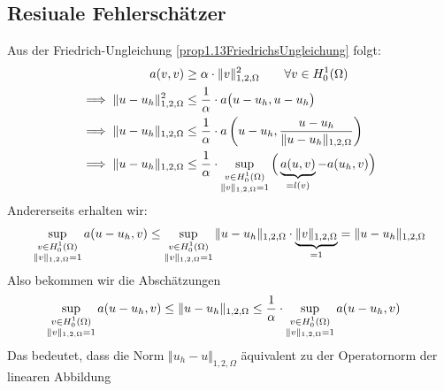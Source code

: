 \subsection*{Resiuale Fehlerschätzer}
Aus der Friedrich-Ungleichung \ref{prop1.13FriedrichsUngleichung} folgt:
\begin{align*}
a(v,v)&\geq\alpha\cdot\Vert v\Vert^2_{1,2,\Omega}\qquad\forall v\in H^1_0(\Omega)\\
\implies
\Vert u-u_h\Vert^2_{1,2,\Omega}
&\leq
\frac{1}{\alpha}\cdot a\big(u-u_h,u-u_h\big)\\
\implies
\Vert u-u_h\Vert_{1,2,\Omega}
&\leq\frac{1}{\alpha}\cdot a\left(u-u_h,\frac{u-u_h}{\Vert u-u_h\Vert_{1,2,\Omega}}\right)\\
\implies
\Vert u-u_h\Vert_{1,2,\Omega}
&\leq\frac{1}{\alpha}\cdot\sup\limits_{\begin{subarray}{c}v\in H^1_0(\Omega)\\\Vert v\Vert_{1,2,\Omega}=1\end{subarray}}\Big(\underbrace{a(u,v)}_{=l(v)}-a(u_h,v)\Big)
\end{align*}
Andererseits erhalten wir:
\begin{align*}
\sup\limits_{\begin{subarray}{c}v\in H^1_0(\Omega)\\\Vert v\Vert_{1,2,\Omega}=1\end{subarray}} a(u-u_h,v)
&\leq
\sup\limits_{\begin{subarray}{c}v\in H^1_0(\Omega)\\\Vert v\Vert_{1,2,\Omega}=1\end{subarray}}
\Vert u-u_h\Vert_{1,2,\Omega}\cdot\underbrace{\Vert v\Vert_{1,2,\Omega}}_{=1}
=\Vert u-u_h\Vert_{1,2,\Omega}\\
\end{align*}
Also bekommen wir die Abschätzungen
\begin{align*}
\sup\limits_{\begin{subarray}{c}v\in H^1_0(\Omega)\\\Vert v\Vert_{1,2,\Omega}=1\end{subarray}} a(u-u_h,v)
&\leq
\Vert u-u_h\Vert_{1,2,\Omega}
\leq\frac{1}{\alpha}\cdot\sup\limits_{\begin{subarray}{c}v\in H^1_0(\Omega)\\\Vert v\Vert_{1,2,\Omega}=1\end{subarray}} a(u-u_h,v)
\end{align*}
Das bedeutet, dass die Norm $\Vert u_h-u\Vert_{1,2,\Omega}$ äquivalent zu der Operatornorm der linearen Abbildung
